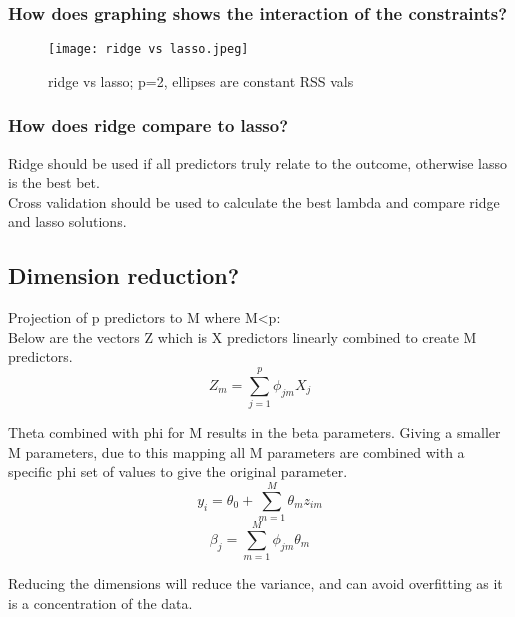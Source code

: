 \documentclass[11pt]{scrartcl} %
\begin{document}
\subsubsection{How does graphing shows the interaction of the constraints?}

\begin{figure}[h] %
	\centering
	\texttt{[image: ridge vs lasso.jpeg]} %
	\caption{ridge vs lasso; p=2, ellipses are constant RSS vals}
\end{figure}

\subsubsection{How does ridge compare to lasso?}

Ridge should be used if all predictors truly relate to the outcome, otherwise lasso is the best bet.\\

Cross validation should be used to calculate the best lambda and compare ridge and lasso solutions.

\subsection{Dimension reduction?}

Projection of p predictors to M where M<p:\\

Below are the vectors Z which is X predictors linearly combined to create M predictors.
\begin{equation}
	Z_m = \sum^p_{j=1}{\phi_{jm}X_j}
\end{equation}

Theta combined with phi for M results in the beta parameters. Giving a smaller M parameters, due to this
mapping all M parameters are combined with a specific phi set of values to give the original parameter.
\begin{equation}
	y_i= \theta_0 + \sum^M_{m=1}{\theta_mz_{im}}
\end{equation}
\begin{equation}
	\beta_j = \sum^M_{m=1}{\phi_{jm}\theta_m}
\end{equation}

Reducing the dimensions will reduce the variance, and can avoid overfitting as it is a concentration
of the data.
\end{document}
